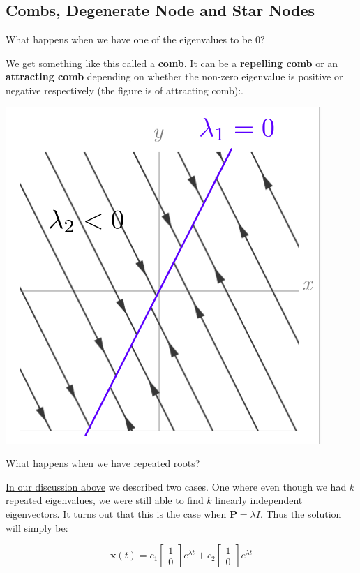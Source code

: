 \documentclass{report}
\begin{document}
\subsection{Combs, Degenerate Node and Star Nodes}

What happens when we have one of the eigenvalues to be 0?

We get something like this called a \textbf{comb}. It can be a \textbf{repelling comb} or an \textbf{attracting comb} depending on whether the non-zero eigenvalue is positive or negative respectively (the figure is of attracting comb):.

\includegraphics[scale=0.4]{comb.png}

What happens when we have repeated roots?

\hyperref[sec:repEigen]{In our discussion above} we described two cases. One where even though we had $k$ repeated eigenvalues, we were still able to find $k$ linearly independent eigenvectors. It turns out that this is the case when $\mathbf{P} = \lambda I$. Thus the solution will simply be:

$$\mathbf{x}(t) = 
c_1
\begin{bmatrix}
    1 \\
    0
\end{bmatrix}
e^{\lambda t}
+
c_2
\begin{bmatrix}
    1 \\
    0
\end{bmatrix}
e^{\lambda t}
$$
\end{document}
